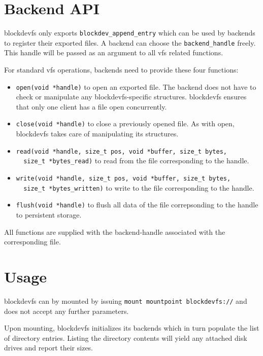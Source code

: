\section{Backend API}

blockdevfs only exports \lstinline+blockdev_append_entry+ which can be used by
backends to register their exported files. A backend can choose the
\lstinline+backend_handle+ freely. This handle will be passed as an argument to
all \acs{vfs} related functions.

For standard \acs{vfs} operations, backends need to provide these four functions:

\begin{itemize}
 \item \lstinline+open(void *handle)+ to open an exported file. The backend does not have to check or manipulate any blockdevfs-specific structures. blockdevfs ensures that only one client has a file open concurrently.
 \item \lstinline+close(void *handle)+ to close a previously opened file. As with open, blockdevfs takes care of manipulating its structures.
 \item \lstinline+read(void *handle, size_t pos, void *buffer, size_t bytes,+\\
       \lstinline+	size_t *bytes_read)+ to read from the file corresponding to the handle.
 \item \lstinline+write(void *handle, size_t pos, void *buffer, size_t bytes,+\\
       \lstinline+	size_t *bytes_written)+ to write to the file corresponding to the handle.
 \item \lstinline+flush(void *handle)+ to flush all data of the file
 		correpsonding to the handle to persistent storage.
\end{itemize}

All functions are supplied with the backend-handle associated with the
corresponding file.

\section{Usage}

blockdevfs can by mounted by issuing \verb+mount mountpoint blockdevfs://+ and
does not accept any further parameters.

Upon mounting, blockdevfs initializes its backends which in turn populate the
list of directory entries. Listing the directory contents will yield any
attached disk drives and report their sizes.

